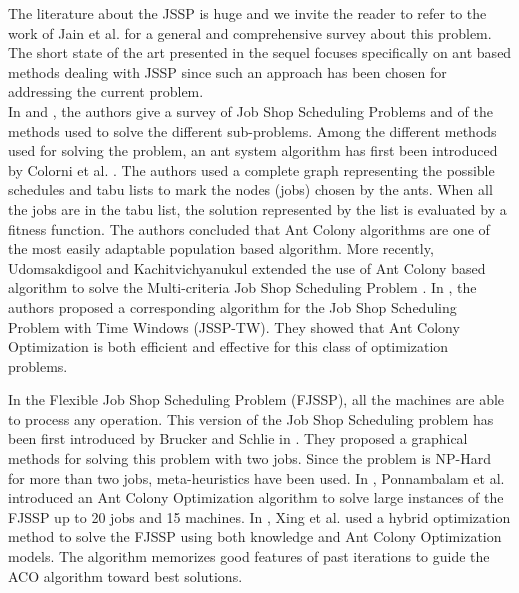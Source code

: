 \documentclass[review]{elsarticle}
\begin{document}
The literature about the JSSP is huge and we invite the reader to refer to the work of Jain et al. \cite{Jain1999} for a general and comprehensive survey about this problem. The short state of the art presented in the sequel focuses specifically on ant based methods dealing with JSSP since such an approach has been chosen for addressing the current problem.\\

In \cite{Jain1999} and \cite{Brucker2010}, the authors give a survey of Job Shop Scheduling Problems and of the methods used to solve the different sub-problems.
Among the different methods used for solving the problem, an ant system algorithm has first been introduced by Colorni et al. \cite{Colorni1994}. The authors used a complete graph representing the possible schedules and tabu lists to mark the nodes (jobs) chosen by the ants. When all the jobs are in the tabu list, the solution represented by the list is evaluated by a fitness function. The authors concluded that Ant Colony algorithms are one of the most easily adaptable population based algorithm. More recently, Udomsakdigool and Kachitvichyanukul extended the use of Ant Colony based algorithm to solve the Multi-criteria Job Shop Scheduling Problem \cite{Udomsakdigool2011}.
In \cite{Huang2008}, the authors proposed a corresponding algorithm for the Job Shop Scheduling Problem with Time Windows (JSSP-TW). They showed that Ant Colony Optimization is both efficient and effective for this class of optimization problems.

In the Flexible Job Shop Scheduling Problem (FJSSP), all the machines are able to process any operation. This version of the Job Shop Scheduling problem has been first introduced by Brucker and Schlie in \cite{Brucker1990}. They proposed a graphical methods for solving this problem with two jobs. Since the problem is NP-Hard for more than two jobs, meta-heuristics have been used. In \cite{Ponnambalam2005}, Ponnambalam et al. introduced an Ant Colony Optimization algorithm to solve large instances of the FJSSP up to 20 jobs and 15 machines. In \cite{Xing2010}, Xing et al. used a hybrid optimization method to solve the FJSSP using both knowledge and Ant Colony Optimization models. The algorithm memorizes good features of past iterations to guide the ACO algorithm toward best solutions.
\end{document}
